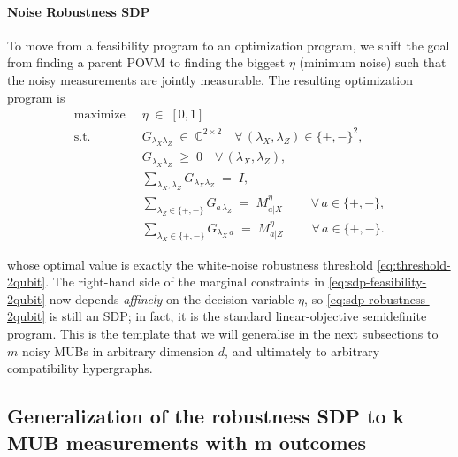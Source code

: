 \documentclass[oneside, a4paper, onecolumn, 11pt]{article}
\theoremstyle{definition}
\theoremstyle{plain}
\theoremstyle{remark}
\begin{document}
\paragraph{Noise Robustness SDP}
To move from a feasibility program to an optimization program, we shift the goal from finding a parent POVM to 
finding the biggest $\eta$ (minimum noise) such that the noisy measurements are jointly measurable.
The resulting optimization program is
\begin{equation}
\begin{aligned}
  \text{maximize} \;\;& \eta \;\in\; [0,1] \\[2pt]
  \text{s.t.}   \;\;& G_{\lambda_X \lambda_Z} \;\in\; \mathbb{C}^{2 \times 2}
                      \quad \forall\, (\lambda_X, \lambda_Z)
                      \in \{+, -\}^{2}, \\[2pt]
                  \;\;& G_{\lambda_X \lambda_Z} \;\geq\; 0
                      \quad \forall\, (\lambda_X, \lambda_Z), \\[2pt]
                  \;\;& \sum_{\lambda_X, \lambda_Z}
                        G_{\lambda_X \lambda_Z} \;=\; I, \\[2pt]
                  \;\;& \sum_{\lambda_Z \in \{+,-\}}
                        G_{a\,\lambda_Z} \;=\; M^{\eta}_{a | X}
                        \qquad\; \forall\, a \in \{+, -\}, \\[2pt]
                  \;\;& \sum_{\lambda_X \in \{+,-\}}
                        G_{\lambda_X\, a} \;=\; M^{\eta}_{a | Z}
                        \qquad\; \forall\, a \in \{+, -\}.
\end{aligned}
\label{eq:sdp-robustness-2qubit}
\end{equation}

whose optimal value is exactly the white-noise robustness threshold
\eqref{eq:threshold-2qubit}. The right-hand side of the marginal
constraints in \eqref{eq:sdp-feasibility-2qubit} now depends
\emph{affinely} on the decision variable $\eta$, so
\eqref{eq:sdp-robustness-2qubit} is still an SDP; in fact, it is the
standard linear-objective semidefinite program. This is the template
that we will generalise in the next subsections to $m$ noisy MUBs in
arbitrary dimension $d$, and ultimately to arbitrary compatibility
hypergraphs.

\subsection{Generalization of the robustness SDP to k MUB measurements with m outcomes}
\end{document}
